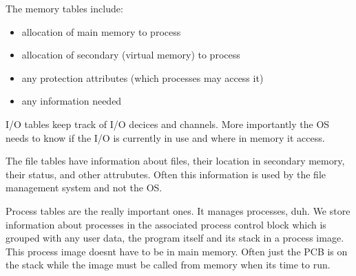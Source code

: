 \documentclass[12pt]{article}
\begin{document}
The memory tables include:
\begin{itemize}
    \item allocation of main memory to process
    \item allocation of secondary (virtual memory) to process
    \item any protection attributes (which processes may access it)
    \item any information needed
\end{itemize}

I/O tables keep track of I/O decices and channels. More importantly the OS needs to know if the I/O is currently in use and where in memory it access.

The file tables have information about files, their location in secondary memory, their status, and other attrubutes. Often this information is used by the file management system and not the OS.

Process tables are the really important ones. It manages processes, duh. We store information about processes in the associated process control block which is grouped with any user data, the program itself and its stack in a process image. This process image doesnt have to be in main memory. Often just the PCB is on the stack while the image must be called from memory when its time to run.
\end{document}

